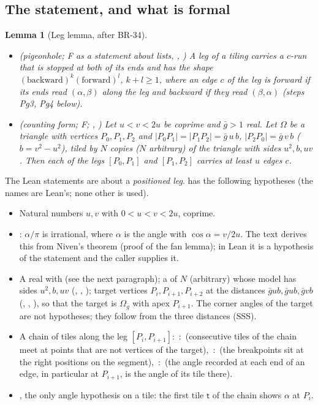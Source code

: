 \documentclass[11pt,reqno]{amsart}
\theoremstyle{plain}
\newtheorem{lemma}[theorem]{Lemma}
\theoremstyle{definition}
\newcommand{\sF}{\textup{\textsf{F}}}
\begin{document}
\subsection{The statement, and what is formal}\label{sub:34}
\begin{lemma}[Leg lemma, after BR-34]\label{lem:leg}
\begin{itemize}
\item[\textup{(a)}] (pigeonhole; \sF{} as a statement about lists, , ) A leg of a tiling carries a $c$-run that is stopped at both of its ends and has the shape $(\text{backward})^k(\text{forward})^l$, $k+l\ge1$, where an edge $c$ of the leg is \emph{forward} if its ends read $(\alpha,\beta)$ along the leg and \emph{backward} if they read $(\beta,\alpha)$ (steps Pg3, Pg4 below).
\item[\textup{(b)}] (counting form; \sF; , ) Let $u<v<2u$ be coprime and $\bar g>1$ real. Let $\Omega$ be a triangle with vertices $P_0,P_1,P_2$ and $|P_0P_1|=|P_1P_2|=\bar g\,u\,b$, $|P_2P_0|=\bar g\,v\,b$ ($b=v^2-u^2$), tiled by $N$ copies ($N$ arbitrary) of the triangle with sides $u^2,b,uv$. Then each of the legs $[P_0,P_1]$ and $[P_1,P_2]$ carries at least $u$ edges $c$.
\end{itemize}
\end{lemma}
The Lean statements are about a \emph{positioned leg}.  has the following hypotheses (the names are Lean's; none other is used).
\begin{itemize}
\item Natural numbers $u,v$ with $0<u<v<2u$, coprime.
\item {}: $\alpha/\pi$ is irrational, where $\alpha$ is the angle with $\cos\alpha=v/2u$. The text derives this from Niven's theorem (proof of the fan lemma); in Lean it is a hypothesis of the statement and the caller supplies it.
\item A real  with  (see the next paragraph); a   of $N$ (arbitrary) whose model has sides $u^2,b,uv$ (, , ); target vertices $P_i,P_{i+1},P_{i+2}$ at the distances $\bar gub,\bar gub,\bar gvb$ (, , ), so that the target is $\Omega_{\bar g}$ with apex $P_{i+1}$. The corner angles of the target are not hypotheses; they follow from the three distances (SSS).
\item A chain of tiles along the leg $[P_i,P_{i+1}]$: \,:\, (consecutive tiles of the chain meet at points that are not vertices of the target), \,:\, (the breakpoints sit at the right positions on the segment), \,:\, (the angle recorded at each end of an edge, in particular at $P_{i+1}$, is the angle of its tile there).
\item {}, the only angle hypothesis on a tile: the first tile $\mathsf t$ of the chain shows $\alpha$ at $P_i$.
\end{itemize}
\end{document}
